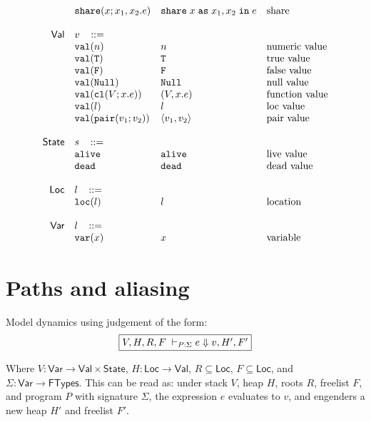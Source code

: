 \documentclass[11pt]{article}
\newcommand{\ms}[1]{\ensuremath{\mathsf{#1}}}
\newcommand{\irl}[1]{\mathtt{#1}}
\newcommand{\sharecst}[4]{\irl{share}\;#1\;\irl{as}\;#2,#3\;\irl{in}\;#4}
\newcommand{\shareabt}[4]{\irl{share}(#1;#2,#3.#4)}
\theoremstyle{definition}
\begin{document}
\[\begin{array}{r l l l l}
  & \shareabt{x}{x_1}{x_2}{e} &\sharecst{x}{x_1}{x_2}{e} &\text{share}\\
  \\
\ms{Val}
        & v   \,\,\,\,\, ::= \\
 	& \irl{val}(n)                                			& n 												& \text{numeric value}\\
 	& \irl{val}(\irl{T})                               			& \irl{T} 								  & \text{true value}\\
 	& \irl{val}(\irl{F})                                			& \irl{F}								  & \text{false value}\\
 	& \irl{val}(\irl{Null})                                  & \irl{Null} 								  & \text{null value}\\
 	& \irl{val}(\irl{cl}(V; x.e))                & (V, x.e) 					& \text{function value}\\
 	& \irl{val}(l)                                			& l 								  & \text{loc value}\\
 	& \irl{val}(\pairexabt{v_1}{v_2})                             & \pairexcst{v_1}{v_2} 								  & \text{pair value}\\
  \\
\ms{State} & s   \,\,\,\,\, ::= \\
 	& \irl{alive}                                			& \irl{alive} 												& \text{live value}\\
 	& \irl{dead}                                			& \irl{dead} 												& \text{dead value}\\\\
\ms{Loc} & l   \,\,\,\,\, ::= \\
 	& \irl{loc}(l)                                			& l 												& \text{location}\\\\
\ms{Var} & l   \,\,\,\,\, ::= \\
 	& \irl{var}(x)                                			& x 												& \text{variable}\\
\end{array}
\]

\newpage
\section{Paths and aliasing}

Model dynamics using judgement of the form:
\[
\fbox{$V,H,R,F \; \vdash_{P : \Sigma} e \Downarrow v, H', F'$}
\]

\noindent
Where $V : \ms{Var} \to \ms{Val} \times \ms{State}$, $H : \ms{Loc} \to \ms{Val}$, $R \subseteq \ms{Loc}$, $F \subseteq \ms{Loc}$, and $\Sigma : \ms{Var} \to \ms{FTypes}$. This can be read as: under stack $V$, heap $H$, roots $R$,
freelist $F$, and program $P$ with signature $\Sigma$, the expression $e$ evaluates to $v$, and engenders a new heap $H'$ and freelist $F'$.\\
\end{document}
